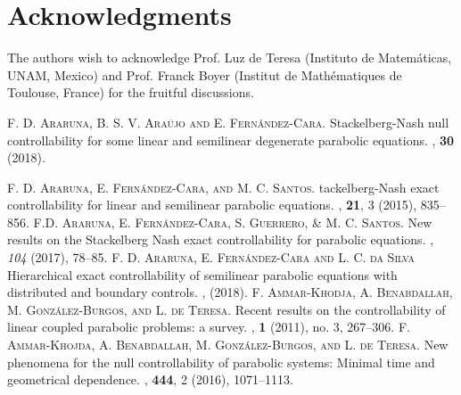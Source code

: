 \documentclass{aims}
\theoremstyle{definition}
\begin{document}
\section*{Acknowledgments} The authors wish to acknowledge  Prof. Luz de Teresa (Instituto de Matem\'aticas, UNAM, Mexico) and Prof. Franck Boyer (Institut de Math\'ematiques de Toulouse, France) for the fruitful discussions. 


\begin{thebibliography}{99}

\textsc{F. D. Araruna, B. S. V. Ara\'ujo and E. Fern\'andez-Cara.}
\newblock Stackelberg-Nash null controllability for some linear and semilinear degenerate parabolic equations. 
, \textbf{30} (2018).

\textsc{F. D. Araruna, E. Fern\'andez-Cara, and M. C. Santos.}
tackelberg-{N}ash exact controllability for linear and semilinear parabolic equations.
, \textbf{21}, 3 (2015), 835--856.
%
\textsc{F.D. Araruna, E. Fern\'andez-Cara, S. Guerrero, \& M. C.  Santos.} 
\newblock New results on the Stackelberg Nash exact controllability for parabolic equations. 
, \textit{104} (2017), 78--85. 
%
\textsc{F. D. Araruna, E. Fern\'andez-Cara and L. C. da  Silva}
\newblock Hierarchical exact controllability of semilinear parabolic equations with distributed and boundary controls.
, (2018). 
%
\textsc{F. Ammar-Khodja, A. Benabdallah, M. Gonz\'alez-Burgos, and L. de Teresa.}
\newblock Recent results on the controllability of linear coupled parabolic problems: a survey. 
, \textbf{1} (2011), no. 3, 267--306.
%
\textsc{F. Ammar-Khojda, A. Benabdallah, M. Gonz\'alez-Burgos, and L. de Teresa.}
\newblock New phenomena for the null controllability of parabolic systems: Minimal time and geometrical dependence.
, \textbf{444}, 2 (2016), 1071--1113.


\end{thebibliography}
\end{document}
